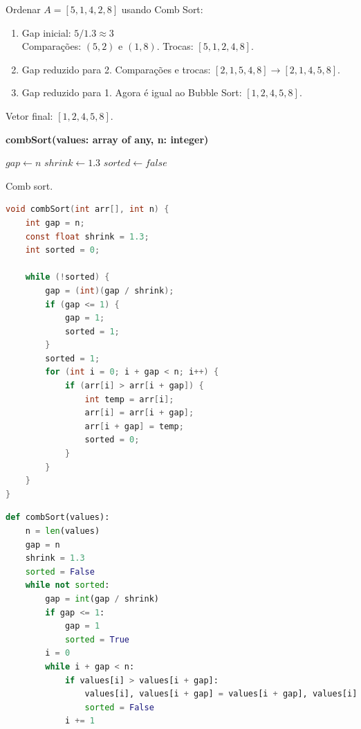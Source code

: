 \begin{exmp}
Ordenar $A = [5, 1, 4, 2, 8]$ usando Comb Sort:

\begin{enumerate}
    \item Gap inicial: $5/1.3 \approx 3$ \\
    Comparações: $(5,2)$ e $(1,8)$. Trocas: $[5,1,2,4,8]$.
    \item Gap reduzido para 2. Comparações e trocas: $[2,1,5,4,8] \rightarrow [2,1,4,5,8]$.
    \item Gap reduzido para 1. Agora é igual ao Bubble Sort: $[1,2,4,5,8]$.
\end{enumerate}

Vetor final: $[1,2,4,5,8]$.
\end{exmp}

\begin{center}
\begin{minipage}{.9\linewidth}
\begin{algorithm}[H]
\DontPrintSemicolon
\textbf{combSort(values: array of any, n: integer)}

$gap \gets n$\;
$shrink \gets 1.3$\;
$sorted \gets false$\;

\caption{Comb sort.}
\label{lab:alg-combSort}
\end{algorithm}
\end{minipage}
\end{center}

\begin{lstlisting}[language=C,caption={Comb sort em C},captionpos=t]
void combSort(int arr[], int n) {
    int gap = n;
    const float shrink = 1.3;
    int sorted = 0;

    while (!sorted) {
        gap = (int)(gap / shrink);
        if (gap <= 1) {
            gap = 1;
            sorted = 1;
        }
        sorted = 1;
        for (int i = 0; i + gap < n; i++) {
            if (arr[i] > arr[i + gap]) {
                int temp = arr[i];
                arr[i] = arr[i + gap];
                arr[i + gap] = temp;
                sorted = 0;
            }
        }
    }
}
\end{lstlisting}

\begin{lstlisting}[language=python,caption={Comb sort em Python},captionpos=t]
def combSort(values):
    n = len(values)
    gap = n
    shrink = 1.3
    sorted = False
    while not sorted:
        gap = int(gap / shrink)
        if gap <= 1:
            gap = 1
            sorted = True
        i = 0
        while i + gap < n:
            if values[i] > values[i + gap]:
                values[i], values[i + gap] = values[i + gap], values[i]
                sorted = False
            i += 1
\end{lstlisting}

